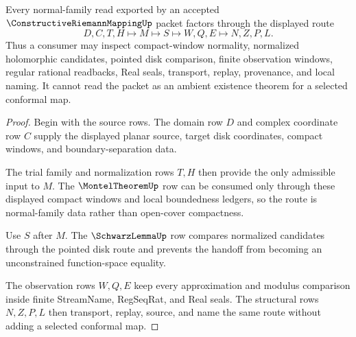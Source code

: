 \begin{theorem}
\label{thm:constructive-riemann-mapping-normal-family-route}
Every normal-family read exported by an accepted $\ConstructiveRiemannMappingUp$ packet factors through the displayed route
$$
D,C,T,H \longmapsto M \longmapsto S \longmapsto W,Q,E \longmapsto N,Z,P,L .
$$
Thus a consumer may inspect compact-window normality, normalized holomorphic candidates, pointed disk comparison, finite observation windows, regular rational readbacks, Real seals, transport, replay, provenance, and local naming. It cannot read the packet as an ambient existence theorem for a selected conformal map.
\end{theorem}
\begin{proof}
Begin with the source rows. The domain row $D$ and complex coordinate row $C$ supply the displayed planar source, target disk coordinates, compact windows, and boundary-separation data.

The trial family and normalization rows $T,H$ then provide the only admissible input to $M$. The $\MontelTheoremUp$ row can be consumed only through these displayed compact windows and local boundedness ledgers, so the route is normal-family data rather than open-cover compactness.

Use $S$ after $M$. The $\SchwarzLemmaUp$ row compares normalized candidates through the pointed disk route and prevents the handoff from becoming an unconstrained function-space equality.

The observation rows $W,Q,E$ keep every approximation and modulus comparison inside finite StreamName, RegSeqRat, and Real seals. The structural rows $N,Z,P,L$ then transport, replay, source, and name the same route without adding a selected conformal map.
\end{proof}

